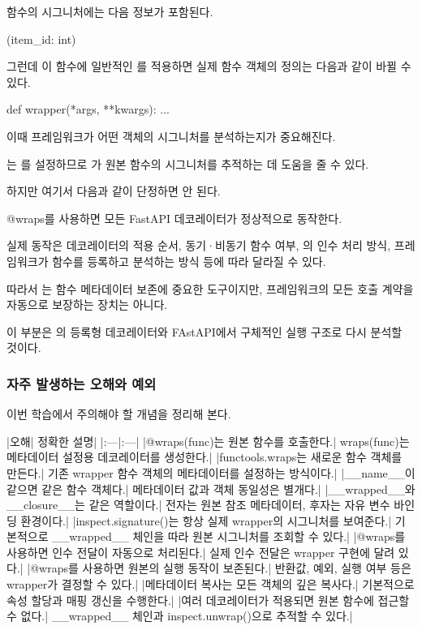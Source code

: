 함수의 시그니처에는 다음 정보가 포함된다.

\begin{dhkcode}
(item_id: int)
\end{dhkcode}

그런데 이 함수에 일반적인 를 적용하면 실제 함수 객체의 정의는 다음과 같이 바뀔 수 있다.

\begin{dhkcode}
def wrapper(*args, **kwargs):
    ...
\end{dhkcode}

이때 프레임워크가 어떤 객체의 시그니처를 분석하는지가 중요해진다.

는 를 설정하므로 가 원본 함수의 시그니처를 추적하는 데 도움을 줄 수 있다.

하지만 여기서 다음과 같이 단정하면 안 된다.

\begin{dhksmry}[centered]
@wraps를 사용하면 모든 FastAPI 데코레이터가 정상적으로 동작한다.
\end{dhksmry}

실제 동작은 데코레이터의 적용 순서, 동기·비동기 함수 여부, 의 인수 처리 방식, 프레임워크가 함수를 등록하고 분석하는 방식 등에 따라 달라질 수 있다.

따라서 는 함수 메타데이터 보존에 중요한 도구이지만, 프레임워크의 모든 호출 계약을 자동으로 보장하는 장치는 아니다.

이 부분은 의 등록형 데코레이터와 FAstAPI에서 구체적인 실행 구조로 다시 분석할 것이다.

\subsubsection{자주 발생하는 오해와 예외}

이번 학습에서 주의해야 할 개념을 정리해 본다.

\begin{dhktable}
|오해|	정확한 설명|
|:---|:---|
|@wraps(func)는 원본 함수를 호출한다.|	wraps(func)는 메타데이터 설정용 데코레이터를 생성한다.|
|functools.wraps는 새로운 함수 객체를 만든다.|	기존 wrapper 함수 객체의 메타데이터를 설정하는 방식이다.|
|__name__이 같으면 같은 함수 객체다.|	메타데이터 값과 객체 동일성은 별개다.|
|__wrapped__와 __closure__는 같은 역할이다.|	전자는 원본 참조 메타데이터, 후자는 자유 변수 바인딩 환경이다.|
|inspect.signature()는 항상 실제 wrapper의 시그니처를 보여준다.|	기본적으로 __wrapped__ 체인을 따라 원본 시그니처를 조회할 수 있다.|
|@wraps를 사용하면 인수 전달이 자동으로 처리된다.|	실제 인수 전달은 wrapper 구현에 달려 있다.|
|@wraps를 사용하면 원본의 실행 동작이 보존된다.|	반환값, 예외, 실행 여부 등은 wrapper가 결정할 수 있다.|
|메타데이터 복사는 모든 객체의 깊은 복사다.|	기본적으로 속성 할당과 매핑 갱신을 수행한다.|
|여러 데코레이터가 적용되면 원본 함수에 접근할 수 없다.|	__wrapped__ 체인과 inspect.unwrap()으로 추적할 수 있다.|
\end{dhktable}

